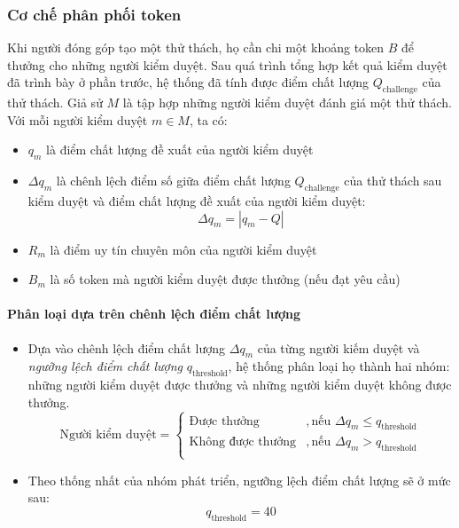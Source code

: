 \subsubsection{Cơ chế phân phối token}

Khi người đóng góp tạo một thử thách, họ cần chi một khoảng token $B$ để thưởng cho những người kiểm duyệt. Sau quá trình tổng hợp kết quả kiểm duyệt đã trình bày ở phần trước, hệ thống đã tính được điểm chất lượng $Q_{\text{challenge}}$ của thử thách.
Giả sử $M$ là tập hợp những người kiểm duyệt đánh giá một thử thách. Với mỗi người kiểm duyệt $m \in M$, ta có:
\begin{itemize}
  \item $q_m$ là điểm chất lượng đề xuất của người kiểm duyệt
  \item $\Delta q_m$ là chênh lệch điểm số giữa điểm chất lượng $Q_{\text{challenge}}$ của thử thách sau kiểm duyệt và điểm chất lượng đề xuất của người kiểm duyệt:
        \[\Delta q_m = |q_{m}-Q|\]
  \item $R_{m}$ là điểm uy tín chuyên môn của người kiểm duyệt
  \item $B_{m}$ là số token mà người kiểm duyệt được thưởng (nếu đạt yêu cầu)
\end{itemize}

\paragraph{Phân loại dựa trên chênh lệch điểm chất lượng}
\begin{itemize}
  \item Dựa vào chênh lệch điểm chất lượng $\Delta q_m$ của từng người kiếm duyệt và \textit{ngưỡng lệch điểm chất lượng} $q_{\text{threshold}}$, hệ thống phân loại họ thành hai nhóm: những người kiểm duyệt được thưởng và những người kiểm duyệt không được thưởng.
        \[
          \text{Người kiểm duyệt} =
          \begin{cases}
            \text{Được thưởng}       & , \text{nếu } \Delta q_m \leq q_{\text{threshold}} \\
            \text{Không được thưởng} & , \text{nếu } \Delta q_m > q_{\text{threshold}}    \\
          \end{cases}
        \]
  \item Theo thống nhất của nhóm phát triển, ngưỡng lệch điểm chất lượng sẽ ở mức sau:
        \[q_{\text{threshold}} = 40 \]

\end{itemize}


